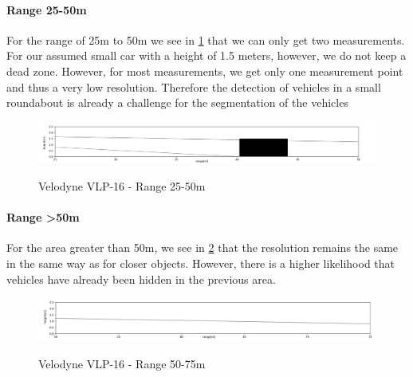 \documentclass[11pt,oneside,openright]{mpreport}
\begin{document}
\paragraph{Range 25-50m}

For the range of 25m to 50m we see in \cref{velodyne_range_50} that we can only get two measurements. For our assumed small car with a height of 1.5 meters,
however, we do not keep a dead zone. However, for most measurements, we get only one measurement point and thus a very low resolution.
Therefore the detection of vehicles in a small roundabout is already a challenge for the segmentation of the vehicles

\begin{figure}[!ht]
\caption{Velodyne VLP-16 - Range 25-50m}
\includegraphics[width=\textwidth]{bilder/range_50.png}
\label{velodyne_range_50}
\end{figure}

\paragraph{Range >50m}

For the area greater than 50m, we see in \cref{velodyne_range_75} that the resolution remains the same in the same way as for closer objects.
However, there is a higher likelihood that vehicles have already been hidden in the previous area.

\begin{figure}[!ht]
\caption{Velodyne VLP-16 - Range 50-75m}
\includegraphics[width=\textwidth]{bilder/range_75.png}
\label{velodyne_range_75}
\end{figure}
\end{document}
